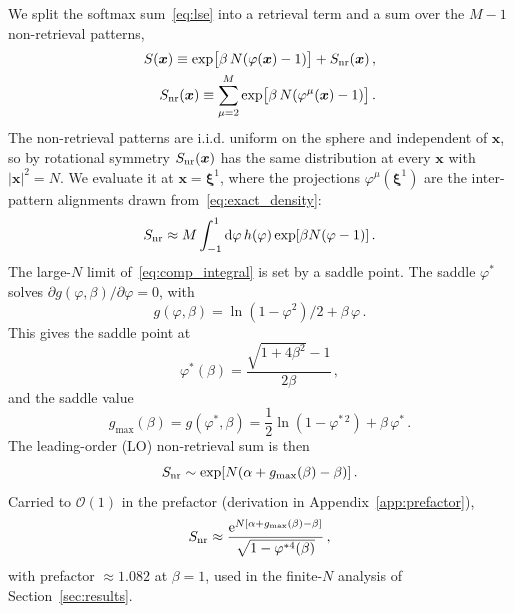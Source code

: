 \documentclass[letterpaper]{article} %
\newcommand{\bxi}{\boldsymbol{\xi}}
\newcommand{\bx}{\bm{x}}
\newcommand{\e}{{\mathrm{e}}}
\newcommand{\dd}{{\mathrm{d}}}
\newcommand{\Bnet}{\beta}
\newcommand{\p}{\partial}
\begin{document}
We split the softmax sum~\eqref{eq:lse} into a retrieval term and a sum over the $M-1$ non-retrieval patterns,
\begin{align}
S(\bx) \equiv \exp\!\big[\Bnet\,N (\varphi(\bx) - 1)\big] + S_{\rm nr}(\bx)\,,
\label{eq:softmax_sum}\\
S_{\rm nr}(\bx) \equiv \sum_{\mu=2}^{M} \exp\!\big[\Bnet\,N (\varphi^\mu(\bx) - 1)\big]\,.
\label{eq:comp_sum}
\end{align}
The non-retrieval patterns are i.i.d. uniform on the sphere and independent of $\bm x$, so by rotational symmetry $S_{\rm nr}(\bm x)$ has the same distribution at every $\bm x$ with $|\bm x|^2 = N$. We evaluate it at $\bm x = \bxi^1$, where the projections $\varphi^\mu(\bxi^1)$ are the inter-pattern alignments drawn from~\eqref{eq:exact_density}:
\begin{equation}
    S_{\rm nr} \approx M \int_{-1}^{1} \dd\varphi\, h(\varphi) \exp[\Bnet N(\varphi - 1)]\,.
    \label{eq:comp_integral}
\end{equation}
The large-$N$ limit of~\eqref{eq:comp_integral} is set by a saddle point. The
saddle $\varphi^*$ solves $\p g(\varphi, \Bnet)/\p\varphi = 0$, with
\begin{equation}
    g(\varphi, \Bnet) = \ln(1-\varphi^2)/2 + \Bnet\,\varphi\,.
\end{equation}
This gives the saddle point at
\begin{equation}
\varphi^*(\Bnet) = \frac{\sqrt{1+4\Bnet^2} - 1}{2\Bnet}\,,
\label{eq:saddle}
\end{equation}
and the saddle value
\begin{equation}
g_{\max}(\Bnet) = g(\varphi^*, \Bnet) = \frac12 \ln(1 - \varphi^{*\,2}) + \Bnet\,\varphi^*\,.
\label{eq:saddle_value}
\end{equation}
The leading-order (LO) non-retrieval sum is then
\begin{equation}
    S_{\rm nr} \sim \exp[N(\alpha + g_{\max}(\Bnet) - \Bnet)]\,.
    \label{eq:comp_saddle}
\end{equation}
Carried to $\mathcal{O}(1)$ in the prefactor (derivation in Appendix~\ref{app:prefactor}),
\begin{equation}
    S_{\rm nr} \approx \frac{\e^{N[\alpha + g_{\max}(\Bnet) - \Bnet]}}{\sqrt{1-\varphi^{*4}(\Bnet)}}\,,
    \label{eq:comp_laplace}
\end{equation}
with prefactor $\approx 1.082$ at $\Bnet = 1$, used in the finite-$N$ analysis of Section~\ref{sec:results}.
\end{document}
